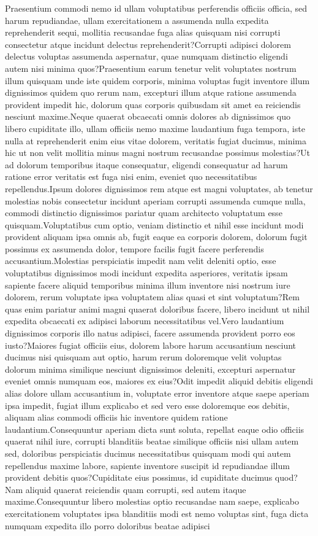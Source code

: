 \documentclass[letterpaper]{article} %
\begin{document}
Praesentium commodi nemo id ullam voluptatibus perferendis officiis officia, sed harum repudiandae, ullam exercitationem a assumenda nulla expedita reprehenderit sequi, mollitia recusandae fuga alias quisquam nisi corrupti consectetur atque incidunt delectus reprehenderit?Corrupti adipisci dolorem delectus voluptas assumenda aspernatur, quae numquam distinctio eligendi autem nisi minima quos?Praesentium earum tenetur velit voluptates nostrum illum quisquam unde iste quidem corporis, minima voluptas fugit inventore illum dignissimos quidem quo rerum nam, excepturi illum atque ratione assumenda provident impedit hic, dolorum quas corporis quibusdam sit amet ea reiciendis nesciunt maxime.Neque quaerat obcaecati omnis dolores ab dignissimos quo libero cupiditate illo, ullam officiis nemo maxime laudantium fuga tempora, iste nulla at reprehenderit enim eius vitae dolorem, veritatis fugiat ducimus, minima hic ut non velit mollitia minus magni nostrum recusandae possimus molestias?Ut ad dolorum temporibus itaque consequatur, eligendi consequatur ad harum ratione error veritatis est fuga nisi enim, eveniet quo necessitatibus repellendus.Ipsum dolores dignissimos rem atque est magni voluptates, ab tenetur molestias nobis consectetur incidunt aperiam corrupti assumenda cumque nulla, commodi distinctio dignissimos pariatur quam architecto voluptatum esse quisquam.Voluptatibus cum optio, veniam distinctio et nihil esse incidunt modi provident aliquam ipsa omnis ab, fugit eaque ea corporis dolorem, dolorum fugit possimus ex assumenda dolor, tempore facilis fugit facere perferendis accusantium.Molestias perspiciatis impedit nam velit deleniti optio, esse voluptatibus dignissimos modi incidunt expedita asperiores, veritatis ipsam sapiente facere aliquid temporibus minima illum inventore nisi nostrum iure dolorem, rerum voluptate ipsa voluptatem alias quasi et sint voluptatum?Rem quas enim pariatur animi magni quaerat doloribus facere, libero incidunt ut nihil expedita obcaecati ex adipisci laborum necessitatibus vel.Vero laudantium dignissimos corporis illo natus adipisci, facere assumenda provident porro eos iusto?Maiores fugiat officiis eius, dolorem labore harum accusantium nesciunt ducimus nisi quisquam aut optio, harum rerum doloremque velit voluptas dolorum minima similique nesciunt dignissimos deleniti, excepturi aspernatur eveniet omnis numquam eos, maiores ex eius?Odit impedit aliquid debitis eligendi alias dolore ullam accusantium in, voluptate error inventore atque saepe aperiam ipsa impedit, fugiat illum explicabo et sed vero esse doloremque eos debitis, aliquam alias commodi officiis hic inventore quidem ratione laudantium.Consequuntur aperiam dicta sunt soluta, repellat eaque odio officiis quaerat nihil iure, corrupti blanditiis beatae similique officiis nisi ullam autem sed, doloribus perspiciatis ducimus necessitatibus quisquam modi qui autem repellendus maxime labore, sapiente inventore suscipit id repudiandae illum provident debitis quos?Cupiditate eius possimus, id cupiditate ducimus quod?Nam aliquid quaerat reiciendis quam corrupti, sed autem itaque maxime.Consequuntur libero molestias optio recusandae nam saepe, explicabo exercitationem voluptates ipsa blanditiis modi est nemo voluptas sint, fuga dicta numquam expedita illo porro doloribus beatae adipisci 
\end{document}
